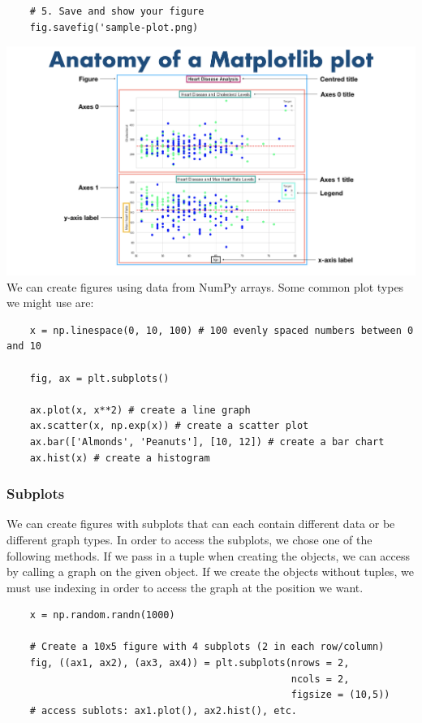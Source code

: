 \documentclass[11pt, a4paper]{article}
\begin{document}
\begin{spacing}{1.1}
\begin{lstlisting}
	# 5. Save and show your figure
	fig.savefig('sample-plot.png) \end{lstlisting} \vspace*{1mm}
	\includegraphics[scale=.5]{anatomy} \\
	We can create figures using data from NumPy arrays. Some common plot types we might use are:
	\begin{lstlisting}
	x = np.linespace(0, 10, 100) # 100 evenly spaced numbers between 0 and 10
	
	fig, ax = plt.subplots()
	
	ax.plot(x, x**2) # create a line graph 
	ax.scatter(x, np.exp(x)) # create a scatter plot
	ax.bar(['Almonds', 'Peanuts'], [10, 12]) # create a bar chart
	ax.hist(x) # create a histogram \end{lstlisting} \newpage

	\subsubsection{Subplots}
	We can create figures with subplots that can each contain different data or be different graph types. In order to access the subplots, we chose one of the following methods. If we pass in a tuple when creating the objects, we can access by calling a graph on the given object. If we create the objects without tuples, we must use indexing in order to access the graph at the position we want.  
	\begin{lstlisting}
	x = np.random.randn(1000)
	
	# Create a 10x5 figure with 4 subplots (2 in each row/column)
	fig, ((ax1, ax2), (ax3, ax4)) = plt.subplots(nrows = 2,
	                                             ncols = 2,
	                                             figsize = (10,5)) 
	# access sublots: ax1.plot(), ax2.hist(), etc.
	

\end{lstlisting}
\end{spacing}
\end{document}
